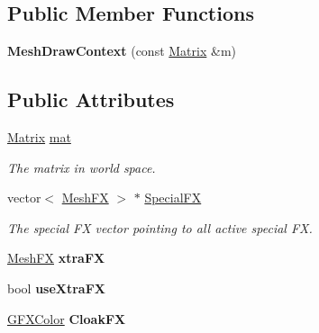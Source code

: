 \subsection*{Public Member Functions}
\begin{DoxyCompactItemize}
\item 
{\bfseries Mesh\+Draw\+Context} (const \hyperlink{classMatrix}{Matrix} \&m)\hypertarget{structMeshDrawContext_a4a44ae658e46d4b2017c113a01141429}{}\label{structMeshDrawContext_a4a44ae658e46d4b2017c113a01141429}

\end{DoxyCompactItemize}
\subsection*{Public Attributes}
\begin{DoxyCompactItemize}
\item 
\hyperlink{classMatrix}{Matrix} \hyperlink{structMeshDrawContext_af89df36085c8cee5b915f2079ffdd166}{mat}\hypertarget{structMeshDrawContext_af89df36085c8cee5b915f2079ffdd166}{}\label{structMeshDrawContext_af89df36085c8cee5b915f2079ffdd166}

\begin{DoxyCompactList}\small\item\em The matrix in world space. \end{DoxyCompactList}\item 
vector$<$ \hyperlink{classMeshFX}{Mesh\+FX} $>$ $\ast$ \hyperlink{structMeshDrawContext_a2233171fc39890c1ffe0e312b1f200b5}{Special\+FX}\hypertarget{structMeshDrawContext_a2233171fc39890c1ffe0e312b1f200b5}{}\label{structMeshDrawContext_a2233171fc39890c1ffe0e312b1f200b5}

\begin{DoxyCompactList}\small\item\em The special FX vector pointing to all active special FX. \end{DoxyCompactList}\item 
\hyperlink{classMeshFX}{Mesh\+FX} {\bfseries xtra\+FX}\hypertarget{structMeshDrawContext_ae918e776282b08b045e41851bb0e29fc}{}\label{structMeshDrawContext_ae918e776282b08b045e41851bb0e29fc}

\item 
bool {\bfseries use\+Xtra\+FX}\hypertarget{structMeshDrawContext_aea475ee55fb4f1ca7b5db6c995177a25}{}\label{structMeshDrawContext_aea475ee55fb4f1ca7b5db6c995177a25}

\item 
\hyperlink{structGFXColor}{G\+F\+X\+Color} {\bfseries Cloak\+FX}\hypertarget{structMeshDrawContext_a7b992930f5c1bd0487a6e656e35fb914}{}\label{structMeshDrawContext_a7b992930f5c1bd0487a6e656e35fb914}


\end{DoxyCompactItemize}
